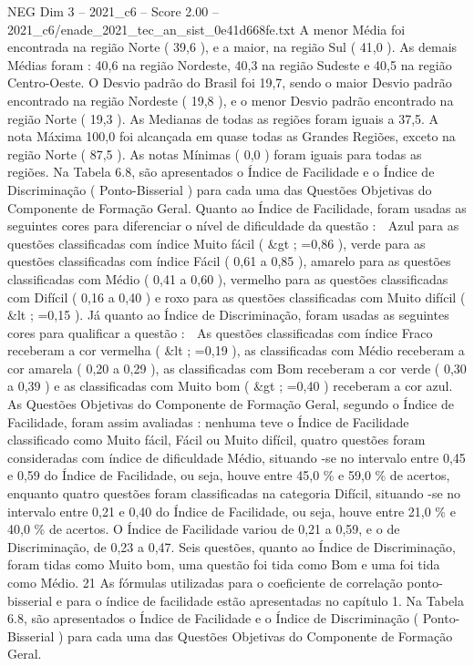 \begin{textsample}{NEG Dim 3 – 2021\_c6 – Score 2.00 – 2021\_c6/enade\_2021\_tec\_an\_sist\_0e41d668fe.txt}
A menor Média foi encontrada na região Norte ( 39,6 ), e a maior, na região Sul ( 41,0 ).
As demais Médias foram : 40,6 na região Nordeste, 40,3 na região Sudeste e 40,5 na região Centro-Oeste.
O Desvio padrão do Brasil foi 19,7, sendo o maior Desvio padrão encontrado na região Nordeste ( 19,8 ), e o menor Desvio padrão encontrado na região Norte ( 19,3 ).
As Medianas de todas as regiões foram iguais a 37,5.
A nota Máxima 100,0 foi alcançada em quase todas as Grandes Regiões, exceto na região Norte ( 87,5 ).
As notas Mínimas ( 0,0 ) foram iguais para todas as regiões.
Na Tabela 6.8, são apresentados o Índice de Facilidade e o Índice de Discriminação ( Ponto-Bisserial ) para cada uma das Questões Objetivas do Componente de Formação Geral.
Quanto ao Índice de Facilidade, foram usadas as seguintes cores para diferenciar o nível de dificuldade da questão :  Azul para as questões classificadas com índice Muito fácil ( \&gt ; =0,86 ), verde para as questões classificadas com índice Fácil ( 0,61 a 0,85 ), amarelo para as questões classificadas com Médio ( 0,41 a 0,60 ), vermelho para as questões classificadas com Difícil ( 0,16 a 0,40 ) e roxo para as questões classificadas com Muito difícil ( \&lt ; =0,15 ).
Já quanto ao Índice de Discriminação, foram usadas as seguintes cores para qualificar a questão :  As questões classificadas com índice Fraco receberam a cor vermelha ( \&lt ; =0,19 ), as classificadas com Médio receberam a cor amarela ( 0,20 a 0,29 ), as classificadas com Bom receberam a cor verde ( 0,30 a 0,39 ) e as classificadas com Muito bom ( \&gt ; =0,40 ) receberam a cor azul.
As Questões Objetivas do Componente de Formação Geral, segundo o Índice de Facilidade, foram assim avaliadas : nenhuma teve o Índice de Facilidade classificado como Muito fácil, Fácil ou Muito difícil, quatro questões foram consideradas com índice de dificuldade Médio, situando -se no intervalo entre 0,45 e 0,59 do Índice de Facilidade, ou seja, houve entre 45,0 \% e 59,0 \% de acertos, enquanto quatro questões foram classificadas na categoria Difícil, situando -se no intervalo entre 0,21 e 0,40 do Índice de Facilidade, ou seja, houve entre 21,0 \% e 40,0 \% de acertos.
O Índice de Facilidade variou de 0,21 a 0,59, e o de Discriminação, de 0,23 a 0,47.
Seis questões, quanto ao Índice de Discriminação, foram tidas como Muito bom, uma questão foi tida como Bom e uma foi tida como Médio. 21 As fórmulas utilizadas para o coeficiente de correlação ponto-bisserial e para o índice de facilidade estão apresentadas no capítulo 1.
Na Tabela 6.8, são apresentados o Índice de Facilidade e o Índice de Discriminação ( Ponto-Bisserial ) para cada uma das Questões Objetivas do Componente de Formação Geral.

\end{textsample}
